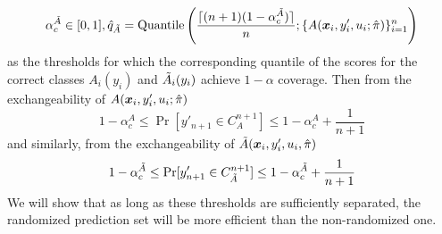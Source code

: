 \[
    \alpha_c^{\Tilde{A}} \in [0, 1], \hat{q}_{\Tilde{A}} = \text{Quantile}\left( \frac{\lceil(n+1)(1 - \alpha_c^{\Tilde{A}})\rceil}{n}; \{A({\bm{x}}_i, y'_i, u_i; \hat{\pi})\}_{i=1}^n \right)
\]    
as the thresholds for which the corresponding quantile of the scores for the correct classes $A_i(y_i)$ and $\Tilde{A}_i(y_i)$ achieve $1-\alpha$ coverage.
Then from the exchangeability of $A({\bm{x}}_i, y'_i, u_i; \hat{\pi})$
\[
    1 - \alpha_c^A \leq \Pr[y'_{n+1} \in C_{A}^{n+1}] \leq 1 - \alpha_c^A + \frac{1}{n+1}
\]
and similarly, from the exchangeability of $\Tilde{A}({\bm{x}}_i, y'_i, u_i, \hat{\pi})$
\[
    1 - \alpha_c^{\Tilde{A}} \leq \Pr[y'_{n+1} \in C_{\Tilde{A}}^{n+1}] \leq 1 - \alpha_c^{\Tilde{A}} + \frac{1}{n+1}
\]
We will show that as long as these thresholds are sufficiently separated, the randomized prediction set will be more efficient than the non-randomized one. 

